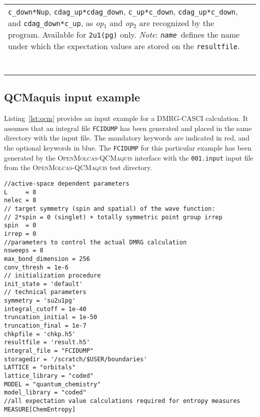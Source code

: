 \documentclass[bibliography=totoc,12pt,a4paper]{scrartcl}
\newcommand{\mol}{\textsc{OpenMolcas}}
\newcommand{\qcm}{\textsc{QCMaquis}}
\begin{document}
\begin{longtable}{ll}
{            \texttt{c\_down*Nup},
            \texttt{cdag\_up*cdag\_down},
            \texttt{c\_up*c\_down},
            \texttt{cdag\_up*c\_down},
            and \texttt{cdag\_down*c\_up},
            as \textit{op$_1$} and \textit{op$_2$} are recognized by the program. Available for \texttt{2u1(pg)} only.\\
            \emph{Note}: \texttt{\textit{name}}\ defines the name under which the expectation values are stored on the \texttt{resultfile}.}\\
 & \\
 & \\
 & \\
 & \\
 & \\
 & \\
 & \\
\bottomrule
\end{longtable}
\FloatBarrier

\subsection{QCMaquis input example}\label{sec:input-qcm}

Listing~\ref{lst:qcm} provides an input example for a DMRG-CASCI calculation. It assumes that an integral file \texttt{FCIDUMP} has been generated and placed in the same directory with the input file. The mandatory keywords are indicated in red, and the optional keywords in blue. The \texttt{FCIDUMP} for this particular example has been generated by the \mol-\qcm{} interface with the \texttt{001.input} input file from the \mol-\qcm{} test directory.

\begin{lstlisting}[language=qcmaquis,caption={Input example for a DMRG-CASCI(8,8) standalone \qcm{} calculation},label=lst:qcm]
 //active-space dependent parameters
L     = 8
nelec = 8
// target symmetry (spin and spatial) of the wave function:
// 2*spin = 0 (singlet) + totally symmetric point group irrep
spin  = 0
irrep = 0
//parameters to control the actual DMRG calculation
nsweeps = 8
max_bond_dimension = 256
conv_thresh = 1e-6
// initialization procedure
init_state = 'default'
// technical parameters
symmetry = 'su2u1pg'
integral_cutoff = 1e-40
truncation_initial = 1e-50
truncation_final = 1e-7
chkpfile = 'chkp.h5'
resultfile = 'result.h5'
integral_file = "FCIDUMP"
storagedir = '/scratch/$USER/boundaries'
LATTICE = "orbitals"
lattice_library = "coded"
MODEL = "quantum_chemistry"
model_library = "coded"
//all expectation value calculations required for entropy measures
MEASURE[ChemEntropy]
\end{lstlisting}
\end{document}

